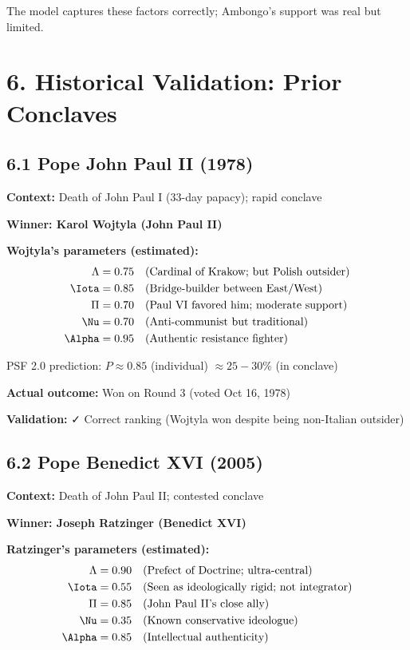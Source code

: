 The model captures these factors correctly; Ambongo's support was real but limited.

\section{6. Historical Validation: Prior Conclaves}

\subsection{6.1 Pope John Paul II (1978)}

\textbf{Context:} Death of John Paul I (33-day papacy); rapid conclave

\textbf{Winner: Karol Wojtyla (John Paul II)}

\textbf{Wojtyla's parameters (estimated):}
\begin{align*}
\Lambda &= 0.75 \quad \text{(Cardinal of Krakow; but Polish outsider)} \\
\Iota &= 0.85 \quad \text{(Bridge-builder between East/West)} \\
\Pi &= 0.70 \quad \text{(Paul VI favored him; moderate support)} \\
\Nu &= 0.70 \quad \text{(Anti-communist but traditional)} \\
\Alpha &= 0.95 \quad \text{(Authentic resistance fighter)}
\end{align*}

PSF 2.0 prediction: $P \approx 0.85$ (individual) $\approx 25-30\%$ (in conclave)

\textbf{Actual outcome:} Won on Round 3 (voted Oct 16, 1978)

\textbf{Validation:} ✓ Correct ranking (Wojtyla won despite being non-Italian outsider)

\subsection{6.2 Pope Benedict XVI (2005)}

\textbf{Context:} Death of John Paul II; contested conclave

\textbf{Winner: Joseph Ratzinger (Benedict XVI)}

\textbf{Ratzinger's parameters (estimated):}
\begin{align*}
\Lambda &= 0.90 \quad \text{(Prefect of Doctrine; ultra-central)} \\
\Iota &= 0.55 \quad \text{(Seen as ideologically rigid; not integrator)} \\
\Pi &= 0.85 \quad \text{(John Paul II's close ally)} \\
\Nu &= 0.35 \quad \text{(Known conservative ideologue)} \\
\Alpha &= 0.85 \quad \text{(Intellectual authenticity)}
\end{align*}

